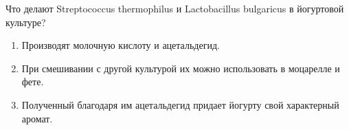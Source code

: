 
Что делают
Streptococcus thermophilus и Lactobacillus bulgaricus в йогуртовой культуре?

\begin{enumerate}
    \item Производят молочную кислоту и ацетальдегид.
    \item При смешивании с другой культурой их можно использовать в моцарелле и фете.
    \item Полученный благодаря им ацетальдегид придает йогурту свой характерный аромат.
\end{enumerate}

\explanationSection

